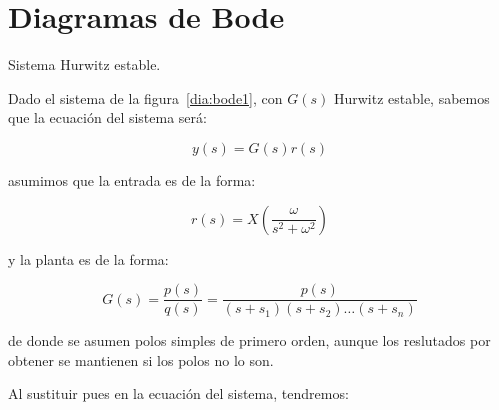 
\chapter{Diagramas de Bode}

    \begin{marginfigure}
        \centering
        \caption{\label{dia:bode1}Sistema Hurwitz estable.}
    \end{marginfigure}

    Dado el sistema de la figura~\ref{dia:bode1}, con $G(s)$ Hurwitz estable, sabemos que la ecuación del sistema será:

    \begin{equation*}
        y(s) = G(s) r(s)
    \end{equation*}

    asumimos que la entrada es de la forma:

    \begin{equation*}
        r(s) = X \left( \frac{\omega}{s^2 + \omega^2} \right)
    \end{equation*}

    y la planta es de la forma:

    \begin{equation*}
        G(s) = \frac{p(s)}{q(s)} = \frac{p(s)}{(s + s_1) (s + s_2) \dots (s + s_n)}
    \end{equation*}

    de donde se asumen polos simples de primero orden, aunque los reslutados por obtener se mantienen si los polos no lo son.

    Al sustituir pues en la ecuación del sistema, tendremos:

